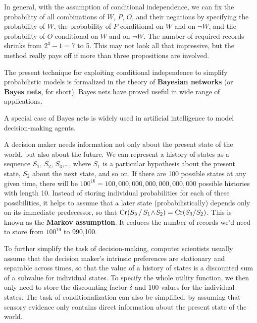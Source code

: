 In general, with the assumption of conditional independence, we can fix the
probability of all combinations of $W$, $P$, $O$, and their negations by
specifying the probability of $W$, the probability of $P$ conditional on $W$ and
on $\neg W$, and the probability of $O$ conditional on $W$ and on $\neg W$. The
number of required records shrinks from $2^3-1 = 7$ to 5. This may not look all
that impressive, but the method really pays off if more than three propositions
are involved.

The present technique for exploiting conditional independence to simplify
probabilistic models is formalized in the theory of \textbf{Bayesian networks}
(or \textbf{Bayes nets}, for short). Bayes nets have proved useful in wide range
of applications.

A special case of Bayes nets%
is widely used in artificial intelligence to model decision-making agents.

A decision maker needs information not only about the present state of the
world, but also about the future. We can represent a history of states as a
sequence $S_1$, $S_2$, $S_3$,\ldots, where $S_1$ is a particular hypothesis about
the present state, $S_2$ about the next state, and so on. If there are 100
possible states at any given time, there will be
$100^{10} = 100,000,000,000,000,000,000$ possible histories with length 10.
Instead of storing individual probabilities for each of these possibilities, it
helps to assume that a later state (probabilistically) depends only on its
immediate predecessor, so that $\text{Cr}(S_3\,/\,S_1 \!\land\! S_2) = \text{Cr}(S_3/S_2)$. This is
known as the \textbf{Markov assumption}. It reduces the number of records we'd
need to store from $100^{10}$ to 990,100.%

To further simplify the task of decision-making, computer scientists usually
assume that the decision maker's intrinsic preferences are stationary and
separable across times, so that the value of a history of states is a discounted
sum of a subvalue for individual states. To specify the whole utility
function, we then only need to store the discounting factor $\delta$ and 100
values for the individual states. The task of conditionalization can also be
simplified, by assuming that sensory evidence only contains direct information
about the present state of the world.

